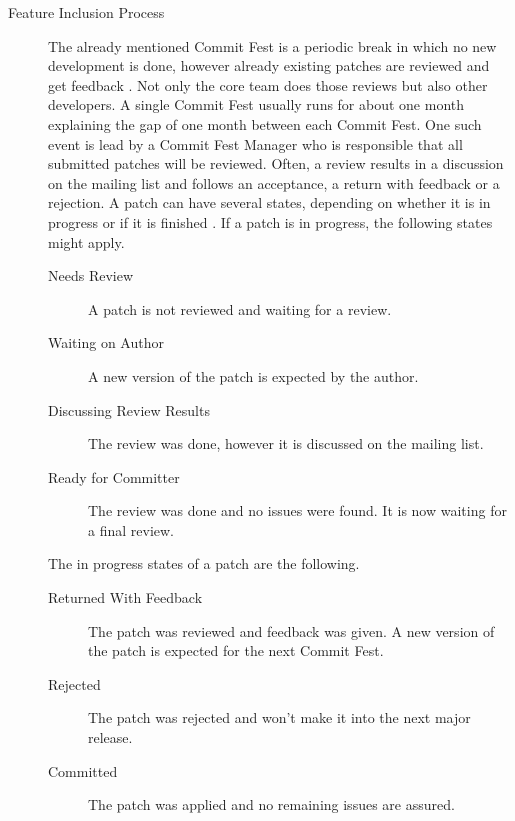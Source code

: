 \begin{description}
\begin{description}
    \item[Feature Inclusion Process] The already mentioned Commit Fest is a
      periodic break in which no new development is done, however already
      existing patches are reviewed and get feedback
      \cite{PostgreSQLCommitFest}. Not only the core team does those reviews
      but also other developers. A single Commit Fest usually runs for about
      one month explaining the gap of one month between each Commit Fest. One
      such event is lead by a Commit Fest Manager who is responsible that all
      submitted patches will be reviewed. Often, a review results in a
      discussion on the mailing list and follows an acceptance, a return with
      feedback or a rejection. A patch can have several states, depending on
      whether it is in progress or if it is finished
      \cite{PostgreSQLCommitFestRunning}. If a patch is in progress, the
      following states might apply.

      \begin{description}

        \item[Needs Review] A patch is not reviewed and waiting for a review.

        \item[Waiting on Author] A new version of the patch is expected by the
          author.

        \item[Discussing Review Results] The review was done, however it is
          discussed on the mailing list.

        \item[Ready for Committer] The review was done and no issues were
          found. It is now waiting for a final review.

      \end{description}

      The in progress states of a patch are the following.

      \begin{description}

        \item[Returned With Feedback] The patch was reviewed and feedback was
          given. A new version of the patch is expected for the next Commit Fest.

        \item[Rejected] The patch was rejected and won't make it into the next
          major release.

        \item[Committed] The patch was applied and no remaining issues are
          assured.

      \end{description}

  \end{description}

\end{description}


